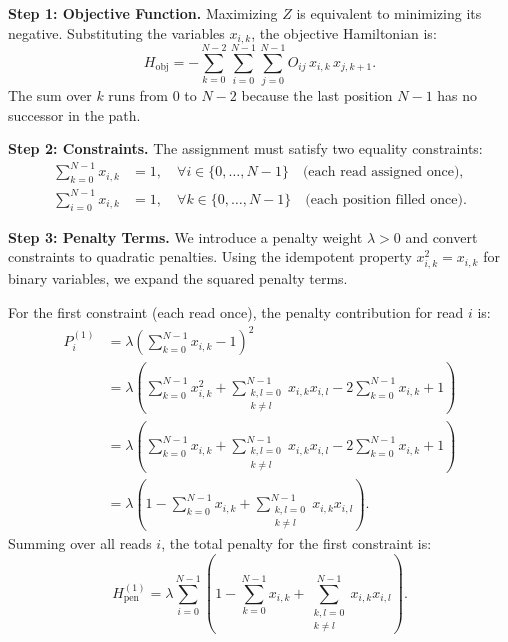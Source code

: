 \documentclass[12pt]{article}
\begin{document}
\textbf{Step 1: Objective Function.}
Maximizing $Z$ is equivalent to minimizing its negative. Substituting the variables $x_{i,k}$, the objective Hamiltonian is:
\begin{equation}
    H_{\text{obj}} = -\sum_{k=0}^{N-2} \sum_{i=0}^{N-1} \sum_{j=0}^{N-1} O_{ij} \, x_{i,k} \, x_{j,k+1}.
\end{equation}
The sum over $k$ runs from $0$ to $N-2$ because the last position $N-1$ has no successor in the path.

\textbf{Step 2: Constraints.}
The assignment must satisfy two equality constraints:
\begin{align}
    \sum_{k=0}^{N-1} x_{i,k} &= 1, \quad \forall i \in \{0, \dots, N-1\} \quad \text{(each read assigned once)}, \\
    \sum_{i=0}^{N-1} x_{i,k} &= 1, \quad \forall k \in \{0, \dots, N-1\} \quad \text{(each position filled once)}.
\end{align}

\textbf{Step 3: Penalty Terms.}
We introduce a penalty weight $\lambda > 0$ and convert constraints to quadratic penalties. Using the idempotent property $x_{i,k}^2 = x_{i,k}$ for binary variables, we expand the squared penalty terms.

For the first constraint (each read once), the penalty contribution for read $i$ is:
\begin{align}
    P_i^{(1)} &= \lambda \left( \sum_{k=0}^{N-1} x_{i,k} - 1 \right)^2 \\
    &= \lambda \left( \sum_{k=0}^{N-1} x_{i,k}^2 + \sum_{\substack{k,l=0 \\ k \neq l}}^{N-1} x_{i,k} x_{i,l} - 2 \sum_{k=0}^{N-1} x_{i,k} + 1 \right) \\
    &= \lambda \left( \sum_{k=0}^{N-1} x_{i,k} + \sum_{\substack{k,l=0 \\ k \neq l}}^{N-1} x_{i,k} x_{i,l} - 2 \sum_{k=0}^{N-1} x_{i,k} + 1 \right) \\
    &= \lambda \left( 1 - \sum_{k=0}^{N-1} x_{i,k} + \sum_{\substack{k,l=0 \\ k \neq l}}^{N-1} x_{i,k} x_{i,l} \right).
\end{align}
Summing over all reads $i$, the total penalty for the first constraint is:
\begin{equation}
    H_{\text{pen}}^{(1)} = \lambda \sum_{i=0}^{N-1} \left( 1 - \sum_{k=0}^{N-1} x_{i,k} + \sum_{\substack{k,l=0 \\ k \neq l}}^{N-1} x_{i,k} x_{i,l} \right).
\end{equation}
\end{document}
